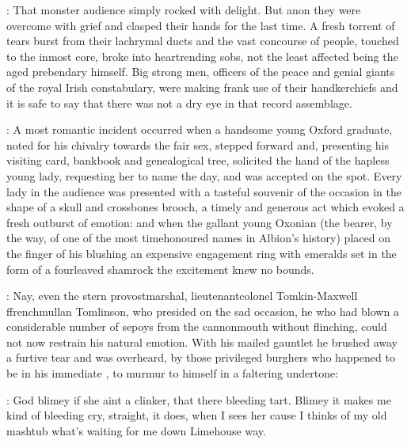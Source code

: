:
That monster audience simply rocked with delight. But anon they were overcome
with grief and clasped their hands for the last time. A fresh torrent of
tears burst from their lachrymal ducts and the vast concourse of people,
touched to the inmost core, broke into heartrending sobs, not the least
affected being the aged prebendary himself. Big strong men, officers of
the peace and genial giants of the royal Irish constabulary,
were making frank use of their handkerchiefs and it is safe to say
that there was not a dry eye in that record assemblage.

:
A most romantic incident occurred when a handsome young Oxford graduate,
noted for his chivalry towards the fair sex, stepped forward and,
presenting his visiting card, bankbook and genealogical tree,
solicited the hand of the hapless young lady, requesting her to
name the day, and was accepted on the spot. Every lady in the
audience was presented with a tasteful souvenir of the occasion
in the shape of a skull and crossbones brooch, a timely and generous
act which evoked a fresh outburst of emotion: and when the gallant
young Oxonian (the bearer, by the way, of one of the most timehonoured
names in Albion's history) placed on the finger of his blushing
an expensive engagement ring with emeralds set in the form of a
fourleaved shamrock the excitement knew no bounds.

:
Nay, even the stern
provostmarshal, lieutenantcolonel Tomkin-Maxwell ffrenchmullan Tomlinson,
who presided on the sad occasion, he who had blown a considerable number
of sepoys from the cannonmouth without flinching, could not now restrain
his natural emotion. With his mailed gauntlet he brushed away a furtive
tear and was overheard, by those privileged burghers who happened to be
in his immediate ,
to murmur to himself in a faltering undertone:

\tomlinson:
God blimey if she aint a clinker,
that there bleeding tart. Blimey it
makes me kind of bleeding cry, straight, it does, when I sees her cause I
thinks of my old mashtub what's waiting for me down Limehouse way.

